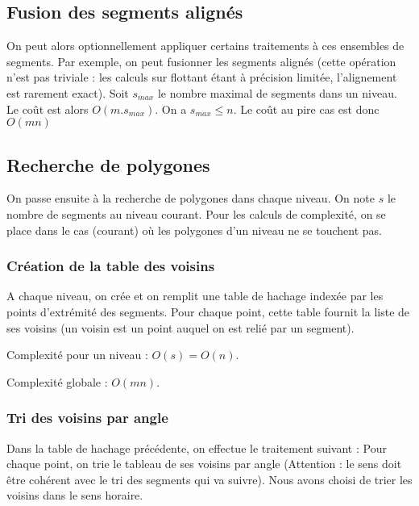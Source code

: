 \documentclass{article}
\begin{document}

\subsection{Fusion des segments alignés}

On peut alors optionnellement appliquer certains traitements à ces ensembles de segments. Par exemple, on peut fusionner les segments alignés (cette opération n'est pas triviale : les calculs sur flottant étant à précision limitée, l'alignement est rarement exact). Soit $s_{max}$ le nombre maximal de segments dans un niveau. Le coût est alors $O(m.s_{max})$. On a $s_{max} \leq n$. Le coût au pire cas est donc $O(mn)$

\subsection{Recherche de polygones}

On passe ensuite à la recherche de polygones dans chaque niveau. On note $s$ le nombre de segments au niveau courant. Pour les calculs de complexité, on se place dans le cas (courant) où les polygones d'un niveau ne se touchent pas.

\subsubsection{Création de la table des voisins}

A chaque niveau, on crée et on remplit une table de hachage indexée par les points d’extrémité des segments. Pour chaque point, cette table fournit la liste de ses voisins (un voisin est un point auquel on est relié par un segment).

Complexité pour un niveau : $O(s) = O(n)$.

Complexité globale : $O(mn)$.

\subsubsection{Tri des voisins par angle}

Dans la table de hachage précédente, on effectue le traitement suivant :
Pour chaque point, on trie le tableau de ses voisins par angle (Attention : le sens doit être cohérent avec le tri des segments qui va suivre). Nous avons choisi de trier les voisins dans le sens horaire.
\end{document}
